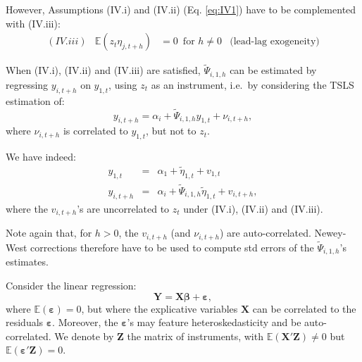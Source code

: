 \documentclass[
  11pt,
]{book}
\theoremstyle{definition}
\theoremstyle{definition}
\theoremstyle{definition}
\theoremstyle{definition}
\theoremstyle{remark}
\begin{document}
However, Assumptions (IV.i) and (IV.ii) (Eq. \eqref{eq:IV1}) have to be complemented with (IV.iii):
\begin{equation*}
\begin{array}{llll}
(IV.iii) & \mathbb{E}(z_t \eta_{j,t+h}) &= 0 \, \mbox{ for } h \ne 0 & \mbox{(lead-lag exogeneity)}
\end{array}
\end{equation*}

When (IV.i), (IV.ii) and (IV.iii) are satisfied, \(\tilde\Psi_{i,1,h}\) can be estimated by regressing \(y_{i,t+h}\) on \(y_{1,t}\), using \(z_t\) as an instrument, i.e.~by considering the TSLS estimation of:
\begin{equation}
y_{i,t+h} = \alpha_i + \tilde\Psi_{i,1,h}y_{1,t} + \nu_{i,t+h},\label{eq:regIV1}
\end{equation}
where \(\nu_{i,t+h}\) is correlated to \(y_{1,t}\), but not to \(z_t\).

We have indeed:
\begin{eqnarray*}
y_{1,t} &=& \alpha_1 + \tilde\eta_{1,t} + v_{1,t}\\
y_{i,t+h} &=& \alpha_i + \tilde\Psi_{i,1,h}\tilde\eta_{1,t} + v_{i,t+h},
\end{eqnarray*}
where the \(v_{i,t+h}\)'s are uncorrelated to \(z_t\) under (IV.i), (IV.ii) and (IV.iii).

Note again that, for \(h>0\), the \(v_{i,t+h}\) (and \(\nu_{i,t+h}\)) are auto-correlated. Newey-West corrections therefore have to be used to compute std errors of the \(\tilde\Psi_{i,1,h}\)'s estimates.

Consider the linear regression:
\[
\mathbf{Y} = \mathbf{X}\boldsymbol\beta + \boldsymbol\varepsilon,
\]
where \(\mathbb{E}(\boldsymbol\varepsilon)=0\), but where the explicative variables \(\mathbf{X}\) can be correlated to the residuals \(\boldsymbol\varepsilon\). Moreover, the \(\boldsymbol\varepsilon\)'s may feature heteroskedasticity and be auto-correlated. We denote by \(\mathbf{Z}\) the matrix of instruments, with \(\mathbb{E}(\mathbf{X}'\mathbf{Z}) \ne 0\) but \(\mathbb{E}(\boldsymbol\varepsilon'\mathbf{Z}) = 0\).
\end{document}
